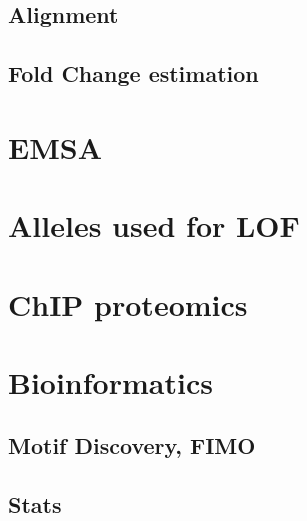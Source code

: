 \subsection{Alignment}

\subsection{Fold Change estimation}
	
\section{EMSA}

\section{Alleles used for LOF}

\section{ChIP proteomics}

\section{Bioinformatics}

\subsection{Motif Discovery, FIMO}

\subsection{Stats}
